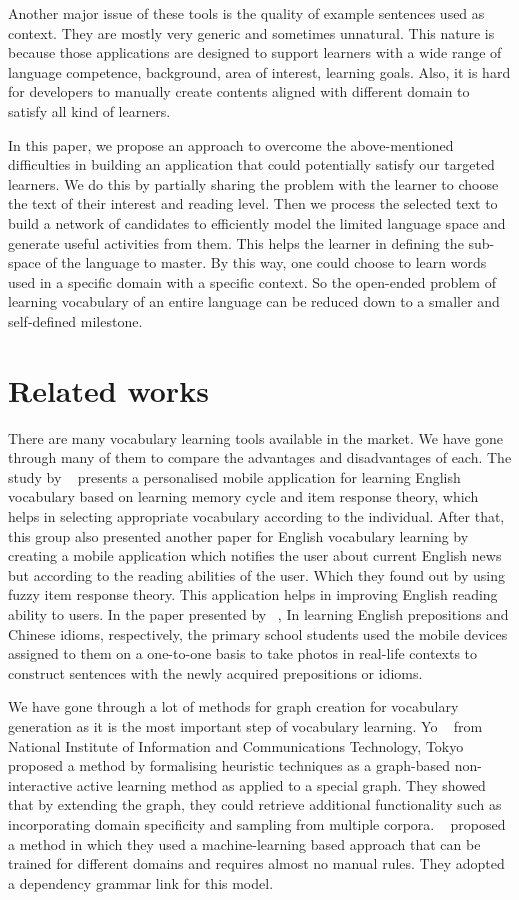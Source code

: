 \documentclass[11pt,a4paper]{article}
\begin{document}
Another major issue of these tools is the quality of example sentences used as context. They are mostly very generic and sometimes unnatural. This nature is because those applications are designed to support learners with a wide range of language competence, background, area of interest, learning goals. Also, it is hard for developers to manually create contents aligned with different domain to satisfy all kind of learners.

In this paper, we propose an approach to overcome the above-mentioned
difficulties in building an application that could potentially satisfy our targeted
learners. We do this by partially sharing the problem with the learner to choose the text of their interest and reading level. Then we process the selected text to build a network of candidates to efficiently model the limited language space and generate useful activities from them. This helps the learner in defining the sub-space of the language to master. By this way, one could choose to learn words used in a specific domain with a specific context. So the open-ended problem of learning vocabulary of an entire language can be reduced down to a smaller and self-defined milestone.

\section{Related works}
There are many vocabulary learning tools available in the market.
We have gone through many of them to compare the advantages and disadvantages of each.
The study by ~\cite{chen2008personalised} presents a personalised mobile application for
learning English vocabulary based on learning memory cycle and item response theory, which helps in selecting appropriate vocabulary according to the individual.
After that, this group also presented another paper for English vocabulary
learning by creating a mobile application which notifies the user about current
English news but according to the reading abilities of the user. Which they found out
by using fuzzy item response theory. This application helps in improving English reading ability to users.
In the paper presented by ~\citet{wong2010mobile}, In learning English prepositions and Chinese idioms, respectively,
the primary school students used the mobile devices assigned to them on a one-to-one basis
to take photos in real-life contexts to construct sentences with the newly acquired prepositions or idioms.

We have gone through a lot of methods for graph creation for vocabulary generation as
it is the most important step of vocabulary learning. Yo ~\citet{ehara2014formalizing}
from National Institute of Information and Communications Technology, Tokyo proposed
a method by formalising heuristic techniques as a graph-based non-interactive active
learning method as applied to a special graph. They showed that by extending the graph,
they could retrieve additional functionality such as incorporating domain specificity and sampling from multiple corpora.
~\citet{zhang2001learning} proposed a method in which they used a machine-learning based approach
that can be trained for different domains and requires almost no manual rules.
They adopted a dependency grammar link for this model.
\end{document}
